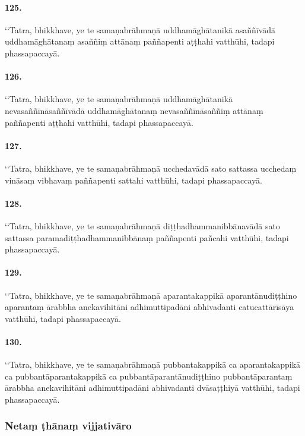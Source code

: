 \paragraph{125.}
‘‘Tatra, bhikkhave, ye te samaṇabrāhmaṇā uddhamāghātanikā asaññīvādā uddhamāghātanaṃ asaññiṃ attānaṃ paññapenti aṭṭhahi vatthūhi, tadapi phassapaccayā.

\paragraph{126.}
‘‘Tatra, bhikkhave, ye te samaṇabrāhmaṇā uddhamāghātanikā nevasaññīnāsaññīvādā uddhamāghātanaṃ nevasaññīnāsaññiṃ attānaṃ paññapenti aṭṭhahi vatthūhi, tadapi phassapaccayā.

\paragraph{127.}
‘‘Tatra, bhikkhave, ye te samaṇabrāhmaṇā ucchedavādā sato sattassa ucchedaṃ vināsaṃ vibhavaṃ paññapenti sattahi vatthūhi, tadapi phassapaccayā.

\paragraph{128.}
‘‘Tatra, bhikkhave, ye te samaṇabrāhmaṇā diṭṭhadhammanibbānavādā sato sattassa paramadiṭṭhadhammanibbānaṃ paññapenti pañcahi vatthūhi, tadapi phassapaccayā.

\paragraph{129.}
‘‘Tatra, bhikkhave, ye te samaṇabrāhmaṇā aparantakappikā aparantānudiṭṭhino aparantaṃ ārabbha anekavihitāni adhimuttipadāni abhivadanti catucattārīsāya vatthūhi, tadapi phassapaccayā.

\paragraph{130.}
‘‘Tatra, bhikkhave, ye te samaṇabrāhmaṇā pubbantakappikā ca aparantakappikā ca pubbantāparantakappikā ca pubbantāparantānudiṭṭhino pubbantāparantaṃ ārabbha anekavihitāni adhimuttipadāni abhivadanti dvāsaṭṭhiyā vatthūhi, tadapi phassapaccayā.

\subsubsection{Netaṃ ṭhānaṃ vijjativāro}

